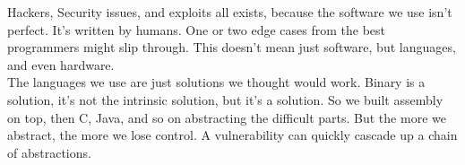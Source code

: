 
Hackers, Security issues, and exploits all exists, because the software
we use isn't perfect. It's written by humans. One or two edge cases from the best
programmers might slip through. This doesn't mean just software,
but languages, and even hardware.\\

\noindent
The languages we use are just solutions we thought would work. Binary is a solution, it's not the intrinsic solution,
but it's a solution. So we built assembly on top, then C, Java, and so on abstracting the
difficult parts. But the more we abstract, the more we lose control. A vulnerability
can quickly cascade up a chain of abstractions.\\